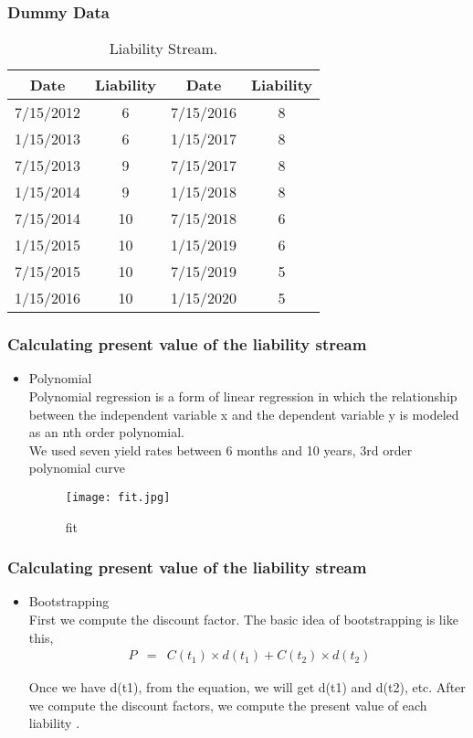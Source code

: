 \documentclass[compress,handout,10pt]{beamer}
\let\olditem\item
\renewcommand{\item}{\setlength{\itemsep}{0.5\baselineskip}\olditem}
\begin{document}
\begin{frame}
    \frametitle{Dummy Data}
\begin{table}[h]
\centering  
\begin{tabular}{cccc}
\hline
Date  &Liability  &Date  &Liability\\ \hline  
7/15/2012  &6  &7/15/2016  &8\\
1/15/2013  &6  &1/15/2017  &8\\ 
7/15/2013  &9  &7/15/2017  &8\\ 
1/15/2014  &9  &1/15/2018  &8\\ 
7/15/2014  &10 &7/15/2018  &6\\ 
1/15/2015  &10  &1/15/2019  &6\\ 
7/15/2015  &10  &7/15/2019  &5 \\ 
1/15/2016  &10  &1/15/2020  &5\\ \hline
\end{tabular}
\caption{Liability Stream.}
\end{table}
\end{frame}

\begin{frame}
    \frametitle{Calculating present value of the liability stream}
\begin{itemize}
\item Polynomial \\
Polynomial regression is a form of linear regression in which the relationship between the independent variable x and the dependent variable y is modeled as an nth order polynomial. \\
\vspace{1mm}
We used seven yield rates between 6 months and 10 years, 3rd order polynomial curve 
\begin{figure}[bottom]
    \begin{center}
        \texttt{[image: fit.jpg]}
    \end{center}
    \caption{fit}
    \label{figure1}
\end{figure}
\end{itemize}
\end{frame}

\begin{frame}
    \frametitle{Calculating present value of the liability stream}
\begin{itemize}
\item Bootstrapping \\
First we compute the discount factor. The basic idea of bootstrapping is like this,\\
\begin{eqnarray}
  \ P &=& C(t_1) \times d(t_1) + C(t_2) \times d(t_2)
\end{eqnarray}

Once we have d(t1), from the equation, we will get d(t1) and d(t2), etc. After we compute the discount factors, we compute the present value of each liability .
\end{itemize}
\end{frame}
\end{document}
